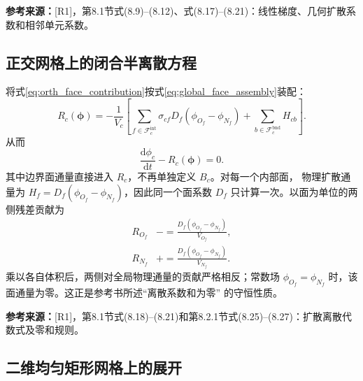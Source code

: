 \documentclass[UTF8,12pt,a4paper]{ctexart}
\numberwithin{equation}{section}
\newcommand{\Rone}{\textnormal{[R1]}}
\newcommand{\source}[1]{%
  \par\smallskip
  \noindent\colorbox{sourcebg}{%
    \parbox{0.955\linewidth}{\raggedright\footnotesize\color{sourcegray}\textbf{参考来源：}#1}%
  }
  \par\smallskip
}
\begin{document}
\source{\Rone，第8.1节式(8.9)--(8.12)、式(8.17)--(8.21)：线性梯度、几何扩散系数和相邻单元系数。}

\subsection{正交网格上的闭合半离散方程}

将式\eqref{eq:orth_face_contribution}按式\eqref{eq:global_face_assembly}装配：
\begin{equation}
  \boxed{
  R_c(\bm\phi)
  =-\frac{1}{V_c}
  \left[
  \sum_{f\in\mathcal F_c^{\mathrm{int}}}
  \sigma_{cf}D_f(\phi_{O_f}-\phi_{N_f})
  +
  \sum_{b\in\mathcal F_c^{\mathrm{bnd}}}H_{cb}
  \right].}
  \label{eq:orth_residual}
\end{equation}
从而
\begin{equation}
  \boxed{
  \frac{\mathrm d\phi_c}{\mathrm dt}-R_c(\bm\phi)=0.}
  \label{eq:orth_semidiscrete}
\end{equation}
其中边界面通量直接进入 $R_c$，不再单独定义 $B_c$。对每一个内部面，
物理扩散通量为 $H_f=D_f(\phi_{O_f}-\phi_{N_f})$，因此同一个面系数
$D_f$ 只计算一次。以面为单位的两侧残差贡献为
\begin{equation}
  \begin{aligned}
  R_{O_f}&\mathrel{-}=\frac{D_f(\phi_{O_f}-\phi_{N_f})}{V_{O_f}},\\
  R_{N_f}&\mathrel{+}=\frac{D_f(\phi_{O_f}-\phi_{N_f})}{V_{N_f}}.
  \end{aligned}
  \label{eq:orth_expanded}
\end{equation}
乘以各自体积后，两侧对全局物理通量的贡献严格相反；常数场
$\phi_{O_f}=\phi_{N_f}$ 时，该面通量为零。这正是参考书所述“离散系数和为零”
的守恒性质。

\source{\Rone，第8.1节式(8.18)--(8.21)和第8.2.1节式(8.25)--(8.27)：扩散离散代数式及零和规则。}

\subsection{二维均匀矩形网格上的展开}
\end{document}
